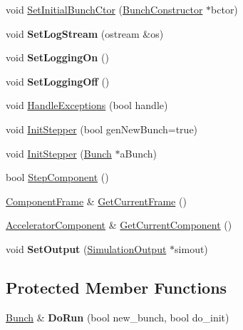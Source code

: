 \begin{DoxyCompactItemize}
void \hyperlink{classTrackingSimulation_a0de2bbd2e382637a6372db08f6d69ffc}{Set\+Initial\+Bunch\+Ctor} (\hyperlink{classBunchConstructor}{Bunch\+Constructor} $\ast$bctor)
\item 
\mbox{\label{classTrackingSimulation_a23bebfbc54a23874a793b8d41958ad3d}} 
void {\bfseries Set\+Log\+Stream} (ostream \&os)
\item 
\mbox{\label{classTrackingSimulation_aaaf9d07bb92e8eed2d18ef4b30488a53}} 
void {\bfseries Set\+Logging\+On} ()
\item 
\mbox{\label{classTrackingSimulation_a6c49eae5c98bf03804767bfb1a61079e}} 
void {\bfseries Set\+Logging\+Off} ()
\item 
void \hyperlink{classTrackingSimulation_a5a2703dbc6eaaf1e35abfa327ddfbdf9}{Handle\+Exceptions} (bool handle)
\item 
void \hyperlink{classTrackingSimulation_a30cc7ce6c637e8b1ce909288e1a13d61}{Init\+Stepper} (bool gen\+New\+Bunch=true)
\item 
void \hyperlink{classTrackingSimulation_ab7456d24ba873db3a5b7d61912d1f551}{Init\+Stepper} (\hyperlink{classBunch}{Bunch} $\ast$a\+Bunch)
\item 
bool \hyperlink{classTrackingSimulation_a374d51e700bf2cdab374a6679c9bfe53}{Step\+Component} ()
\item 
\hyperlink{classComponentFrame}{Component\+Frame} \& \hyperlink{classTrackingSimulation_aa48c7809cc42ad03aaf5a8173ca0ca94}{Get\+Current\+Frame} ()
\item 
\hyperlink{classAcceleratorComponent}{Accelerator\+Component} \& \hyperlink{classTrackingSimulation_a66d2ecb8dc7a799b92cc5e4d179defb2}{Get\+Current\+Component} ()
\item 
\mbox{\label{classTrackingSimulation_a41892aa76f68e136a2de50e7f30c45e3}} 
void {\bfseries Set\+Output} (\hyperlink{classSimulationOutput}{Simulation\+Output} $\ast$simout)
\end{DoxyCompactItemize}
\subsection*{Protected Member Functions}
\begin{DoxyCompactItemize}
\item 
\mbox{\label{classTrackingSimulation_a415ec3f11cdba0a038a232d7f3996e1f}} 
\hyperlink{classBunch}{Bunch} \& {\bfseries Do\+Run} (bool new\+\_\+bunch, bool do\+\_\+init)
\end{DoxyCompactItemize}
